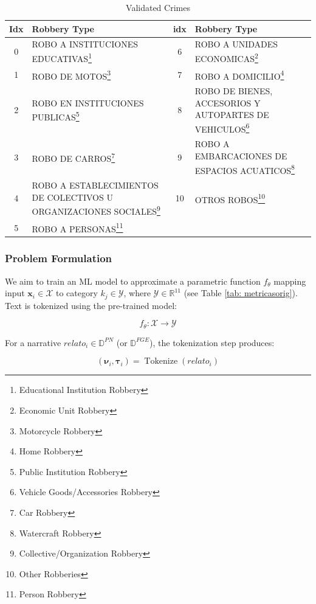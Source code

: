 \documentclass[onecolumn, journal, english, 12pt, a4paper]{IEEEtran} %
\DeclareMathOperator{\Tokenize}{Tokenize}
\theoremstyle{definition}
\begin{document}
    \begin{table}[htbp]
    \centering
    \scriptsize
    \begin{tabularx}{\textwidth}{|c|X|c|X|}
        \hline
        \textbf{Idx} & \textbf{Robbery Type} & \textbf{idx} & \textbf{Robbery Type} \\
        \hline
        0 & ROBO A INSTITUCIONES EDUCATIVAS\footnote{Educational Institution Robbery} & 6 & ROBO A UNIDADES ECONOMICAS\footnote{Economic Unit Robbery} \\
        1 & ROBO DE MOTOS\footnote{Motorcycle Robbery} & 7 & ROBO A DOMICILIO\footnote{Home Robbery} \\
        2 & ROBO EN INSTITUCIONES PUBLICAS\footnote{Public Institution Robbery} & 8 & ROBO DE BIENES, ACCESORIOS Y AUTOPARTES DE VEHICULOS\footnote{Vehicle Goods/Accessories Robbery} \\
        3 & ROBO DE CARROS\footnote{Car Robbery} & 9 & ROBO A EMBARCACIONES DE ESPACIOS ACUATICOS\footnote{Watercraft Robbery} \\
        4 & ROBO A ESTABLECIMIENTOS DE COLECTIVOS U ORGANIZACIONES SOCIALES\footnote{Collective/Organization Robbery} & 10 & OTROS ROBOS\footnote{Other Robberies} \\
        5 & ROBO A PERSONAS\footnote{Person Robbery} & & \\
        \hline
    \end{tabularx}
    \caption{Validated Crimes}
    \label{tab:listofRobberiesValidados}
\end{table}




\subsubsection{Problem Formulation}
We aim to train an ML model to approximate a parametric function
$f_\theta$ mapping input $\mathbf{x}_i \in \mathbf{\mathcal{X}}$ to
category $k_j \in \mathcal{Y}$, where
$\mathcal{Y} \in \mathbb{R}^{11}$ (see Table \ref{tab:
  metricasorig}). Text is tokenized using the pre-trained model:

\begin{equation}\label{eq:clasificacion}
  f_\theta: \mathbf{\mathcal{X}} \longrightarrow \mathbf{\mathcal{Y}}
\end{equation}

For a narrative $relato_i \in \mathbb{D}^{PN}$ (or
$\mathbb{D}^{FGE}$), the tokenization step produces:

\begin{equation}
(\boldsymbol{\nu}_i, \boldsymbol{\tau}_i) = \Tokenize(relato_i)
\end{equation}
\end{document}
